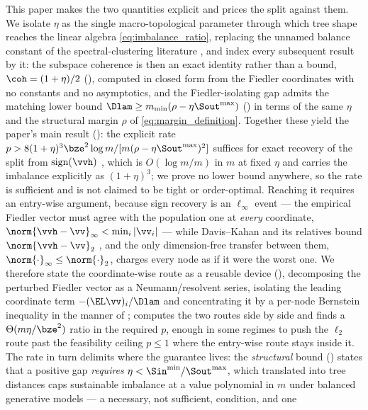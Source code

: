 This paper makes the two quantities explicit and prices the split against
them. We isolate $\eta$ as the single macro-topological parameter through
which tree shape reaches the linear algebra \eqref{eq:imbalance_ratio},
replacing the unnamed balance constant of the spectral-clustering literature
\cite{Balakrishnan2011clustering}, and index every subsequent result by it:
the subspace coherence is then an exact identity rather than a bound,
$\coh=(1+\eta)/2$ (), computed in closed form from the
Fiedler coordinates with no constants and no asymptotics, and the
Fiedler-isolating gap admits the matching lower bound
$\Dlam\ge m_{\min}(\rho-\eta\Sout^{\max})$ () in terms of the
same $\eta$ and the structural margin $\rho$ of \eqref{eq:margin_definition}.
Together these yield the paper's main result (): the
explicit rate $p>8(1+\eta)^3\bze^2\log m/[m(\rho-\eta\Sout^{\max})^2]$
suffices for exact recovery of the split from $\mathrm{sign}(\vvh)$ \hp,
which is $O(\log m/m)$ in $m$ at fixed $\eta$ and carries the imbalance
explicitly as $(1+\eta)^3$; we prove no lower bound anywhere, so the rate is
sufficient and is not claimed to be tight or order-optimal. Reaching it
requires an entry-wise argument, because sign recovery is an $\ell_\infty$
event --- the empirical Fiedler vector must agree with the population one at
\emph{every} coordinate, $\norm{\vvh-\vv}_\infty<\min_i|\vv_i|$ --- while
Davis--Kahan and its relatives bound $\norm{\vvh-\vv}_2$
\cite{davis1970rotation}, and the only dimension-free transfer between them,
$\norm{\cdot}_\infty\le\norm{\cdot}_2$, charges every node as if it were the
worst one. We therefore state the coordinate-wise route as a reusable device
(), decomposing the perturbed Fiedler vector as a
Neumann/resolvent series, isolating the leading coordinate term
$-(\EL\vv)_i/\Dlam$ and concentrating it by a per-node Bernstein inequality
in the manner of \cite{eldridge2017unperturbed, fan2018eigenvector,
abbe2020entrywise};  computes the two routes side by side
and finds a $\Theta(m\eta/\bze^2)$ ratio in the required $p$, enough in some
regimes to push the $\ell_2$ route past the feasibility ceiling $p\le1$ where
the entry-wise route stays inside it. The rate in turn delimits where the
guarantee lives: the \emph{structural} bound () states
that a positive gap \emph{requires} $\eta<\Sin^{\min}/\Sout^{\max}$, which
translated into tree distances caps sustainable imbalance at a value
polynomial in $m$ under balanced generative models \cite{erdos1999logs,
aldous2001stochastic} --- a necessary, not sufficient, condition, and one
